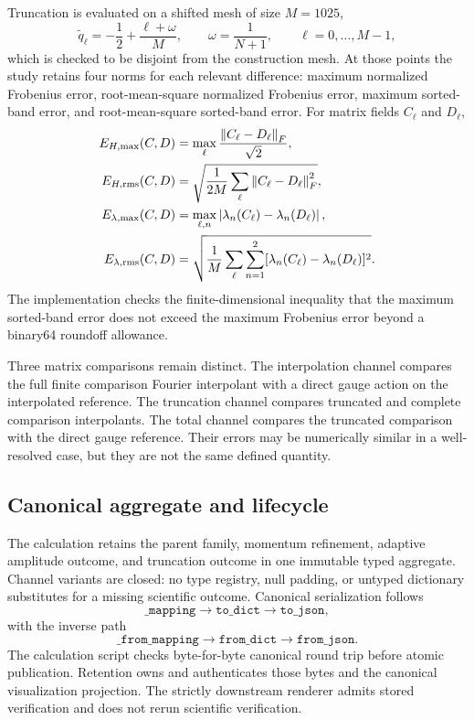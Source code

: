 Truncation is evaluated on a shifted mesh of size $M=1025$,
\begin{equation}
 \widetilde q_\ell=-\frac12+\frac{\ell+\omega}{M},
 \qquad
 \omega=\frac{1}{N+1},
 \qquad \ell=0,\ldots,M-1,
 \label{eq:shifted-evaluation-mesh}
\end{equation}
which is checked to be disjoint from the construction mesh.  At those points the study
retains four norms for each relevant difference: maximum normalized Frobenius error,
root-mean-square normalized Frobenius error, maximum sorted-band error, and
root-mean-square sorted-band error.  For matrix fields $C_\ell$ and $D_\ell$,
\begin{align}
 E_{H,\max}(C,D)&=\max_\ell\frac{\left\lVert C_\ell-D_\ell\right\rVert_F}{\sqrt2},\\
 E_{H,\mathrm{rms}}(C,D)&=
 \sqrt{\frac{1}{2M}\sum_\ell\left\lVert C_\ell-D_\ell\right\rVert_F^2},\\
 E_{\lambda,\max}(C,D)&=\max_{\ell,n}
 \left\lvert \lambda_n(C_\ell)-\lambda_n(D_\ell)\right\rvert,\\
 E_{\lambda,\mathrm{rms}}(C,D)&=
 \sqrt{\frac{1}{M}\sum_\ell\sum_{n=1}^2
 [\lambda_n(C_\ell)-\lambda_n(D_\ell)]^2}.
 \label{eq:truncation-errors}
\end{align}
The implementation checks the finite-dimensional inequality that the maximum sorted-band
error does not exceed the maximum Frobenius error beyond a binary64 roundoff allowance.

Three matrix comparisons remain distinct.  The interpolation channel compares the full
finite comparison Fourier interpolant with a direct gauge action on the interpolated
reference.  The truncation channel compares truncated and complete comparison
interpolants.  The total channel compares the truncated comparison with the direct gauge
reference.  Their errors may be numerically similar in a well-resolved case, but they
are not the same defined quantity.

\subsection{Canonical aggregate and lifecycle}

The calculation retains the parent family, momentum refinement, adaptive amplitude
outcome, and truncation outcome in one immutable typed aggregate.  Channel variants are
closed: no type registry, null padding, or untyped dictionary substitutes for a missing
scientific outcome.  Canonical serialization follows
\begin{equation}
 \texttt{\_mapping}\longrightarrow\texttt{to\_dict}
 \longrightarrow\texttt{to\_json},
 \label{eq:serialization-forward}
\end{equation}
with the inverse path
\begin{equation}
 \texttt{\_from\_mapping}\longrightarrow\texttt{from\_dict}
 \longrightarrow\texttt{from\_json}.
 \label{eq:serialization-inverse}
\end{equation}
The calculation script checks byte-for-byte canonical round trip before atomic
publication.  Retention owns and authenticates those bytes and the canonical
visualization projection.  The strictly downstream renderer admits stored verification
and does not rerun scientific verification.
